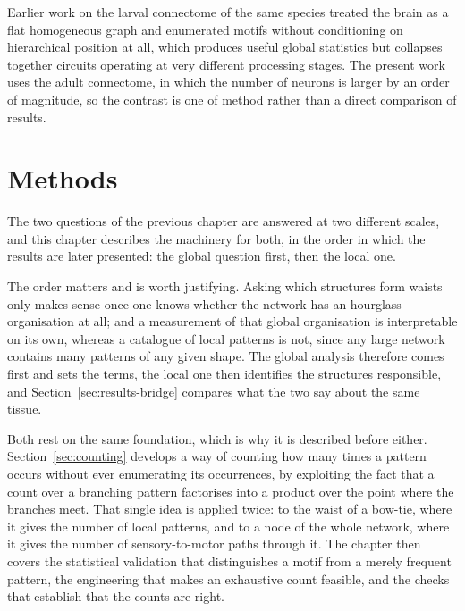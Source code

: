 \documentclass[12pt,a4paper,oneside]{article}
\theoremstyle{definition}
\theoremstyle{plain}
\begin{document}
Earlier work on the larval connectome of the same species
\cite{corradini2025} treated the brain as a flat homogeneous graph and
enumerated motifs without conditioning on hierarchical position at all,
which produces useful global statistics but collapses together circuits
operating at very different processing stages. The present work uses the
adult connectome, in which the number of neurons is larger by an order of
magnitude, so the contrast is one of method rather than a direct
comparison of results.

\section{Methods}
\label{sec:methods}

The two questions of the previous chapter are answered at two different
scales, and this chapter describes the machinery for both, in the order in
which the results are later presented: the global question first, then the
local one.

The order matters and is worth justifying. Asking which structures form
waists only makes sense once one knows whether the network has an hourglass
organisation at all; and a measurement of that global organisation is
interpretable on its own, whereas a catalogue of local patterns is not,
since any large network contains many patterns of any given shape. The
global analysis therefore comes first and sets the terms, the local one then
identifies the structures responsible, and Section~\ref{sec:results-bridge}
compares what the two say about the same tissue.

Both rest on the same foundation, which is why it is described before either.
Section~\ref{sec:counting} develops a way of counting how many times a
pattern occurs without ever enumerating its occurrences, by exploiting the
fact that a count over a branching pattern factorises into a product over
the point where the branches meet. That single idea is applied twice: to the
waist of a bow-tie, where it gives the number of local patterns, and to a
node of the whole network, where it gives the number of sensory-to-motor
paths through it. The chapter then covers the statistical validation that
distinguishes a motif from a merely frequent pattern, the engineering that
makes an exhaustive count feasible, and the checks that establish that the
counts are right.
\end{document}
